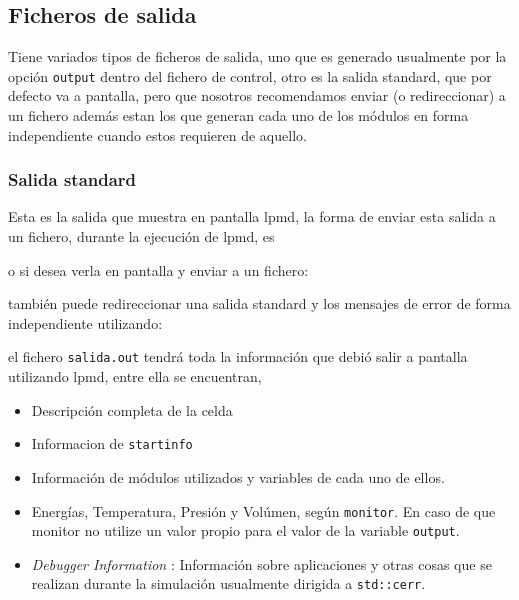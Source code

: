 \subsection{Ficheros de salida}
{\lpmd} Tiene variados tipos de ficheros de salida, uno que es generado usualmente por la opci\'on \verb|output| dentro del fichero de control, otro es la salida standard, que por defecto va a pantalla, pero que nosotros recomendamos enviar (o redireccionar) a un fichero adem\'as estan los que generan cada uno de los m\'odulos en forma independiente cuando estos requieren de aquello.

\subsubsection{Salida standard}
Esta es la salida que muestra en pantalla lpmd, la forma de enviar esta salida a un fichero, durante la ejecuci\'on de lpmd, es


o si desea verla en pantalla y enviar a un fichero:


tambi\'en puede redireccionar una salida standard y los mensajes de error de forma independiente utilizando:


el fichero \verb|salida.out| tendr\'a toda la informaci\'on que debi\'o salir a pantalla utilizando lpmd, entre ella se encuentran,

\begin{itemize}
 \item Descripci\'on completa de la celda
 \item Informacion de \verb|startinfo|
 \item Informaci\'on de m\'odulos utilizados y variables de cada uno de ellos.
 \item Energ\'ias, Temperatura, Presi\'on y Vol\'umen, seg\'un \verb|monitor|. En caso de que monitor no utilize un valor propio para el valor de la variable \verb|output|.
 \item \textit{Debugger Information} : Informaci\'on sobre aplicaciones y otras cosas que se realizan durante la simulaci\'on usualmente dirigida a \verb|std::cerr|.
\end{itemize}


